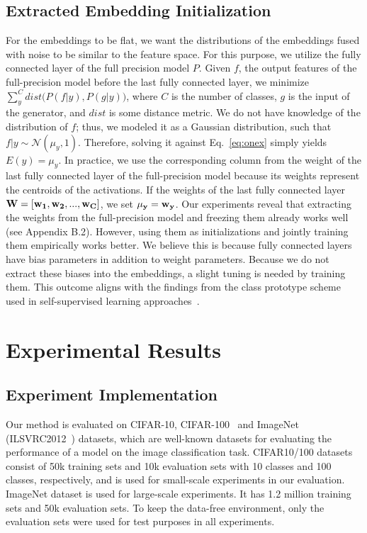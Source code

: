 \documentclass{article}
\newcommand{\rev}[1]{{\color{olivegreen}#1}}
\renewcommand{\rev}[1]{#1}
\begin{document}
\subsection{Extracted Embedding Initialization}
For the embeddings to be flat, we want the distributions of the embeddings fused with noise to be similar to the feature space.
For this purpose, we utilize the fully connected layer of the full precision model $P$.
Given $f$, the output features of the full-precision model before the last fully connected layer, we minimize 
    $\sum_y^C{dist\big( P(f|y), P(g|y)\big) }$,
where $C$ is the number of classes, $g$ is the input of the generator, and $dist$ is some distance metric.
We do not have knowledge of the distribution of $f$; thus, we modeled it as a Gaussian distribution, such that $f|y \sim \mathcal{N}(\mu_y, 1)$.
Therefore, solving it against Eq.~\ref{eq:onex} simply yields $ E(y) = \mu_y$.
In practice, we use the corresponding column from the weight of the last fully connected layer of the full-precision model because its weights represent the centroids of the activations. 
If the weights of the last fully connected layer ${\bf W} = [{\bf w_1, w_2, ..., w_C}]$, we set ${\bf \mu_y = w_y}$.
Our experiments reveal that extracting the weights from the full-precision model and freezing them already works well \rev{(see Appendix B.2)}. 
However, using them as initializations and jointly training them empirically works better. 
We believe this is because fully connected layers have bias parameters in addition to weight parameters.
Because we do not extract these biases into the embeddings, a slight tuning is needed by training them.  
This outcome aligns with the findings from the class prototype scheme used in self-supervised learning approaches~\cite{saito2019semi, saito2020universal}.



\section{Experimental Results}
\label{sec:exp}

\subsection{Experiment Implementation}
Our method is evaluated on CIFAR-10, CIFAR-100~\cite{cifar} and ImageNet (ILSVRC2012~\cite{imagenet}) datasets, which are well-known datasets for evaluating the performance of a model on the image classification task. 
CIFAR10/100 datasets consist of 50k training sets and 10k evaluation sets with 10 classes and 100 classes, respectively, and is used for small-scale experiments in our evaluation.
ImageNet dataset is used for large-scale experiments. 
It has 1.2 million training sets and 50k evaluation sets. 
To keep the data-free environment, only the evaluation sets were used for test purposes in all experiments. 
\end{document}
